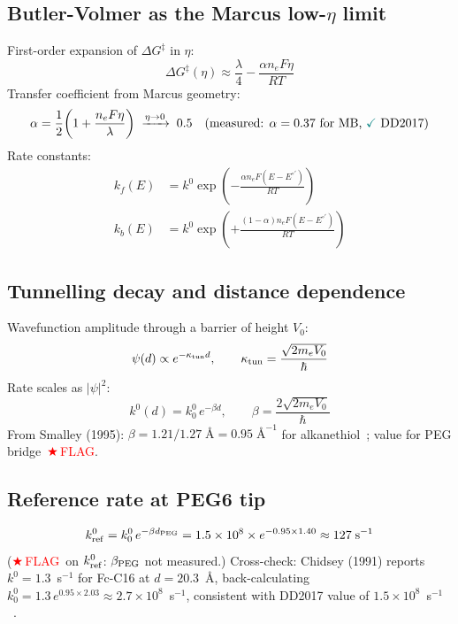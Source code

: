 \documentclass[10pt,a4paper]{article}
\numberwithin{equation}{section}
\newcommand{\FLAG}{\textcolor{red}{$\bigstar$\,FLAG}}
\newcommand{\CONF}{\textcolor{teal}{\checkmark}}
\newcommand{\kzero}{k^0}
\begin{document}
\subsection{Butler-Volmer as the Marcus low-$\eta$ limit}

First-order expansion of $\Delta G^\ddagger$ in $\eta$:
\begin{equation}
  \Delta G^\ddagger(\eta) \approx \frac{\lambda}{4} - \frac{\alpha n_e F\eta}{RT}
\end{equation}
Transfer coefficient from Marcus geometry:
\begin{equation}
  \alpha = \frac{1}{2}\!\left(1 + \frac{n_e F\eta}{\lambda}\right)
  \;\xrightarrow{\eta\to0}\; 0.5
  \quad\text{(measured: }\alpha = 0.37\text{ for MB, \CONF\ DD2017)}
\end{equation}
Rate constants:
\begin{align}
  k_f(E) &= \kzero\exp\!\left(-\frac{\alpha n_e F(E-E^{\circ\prime})}{RT}\right) \\
  k_b(E) &= \kzero\exp\!\left(+\frac{(1-\alpha)n_e F(E-E^{\circ\prime})}{RT}\right)
\end{align}

\subsection{Tunnelling decay and distance dependence}

Wavefunction amplitude through a barrier of height $V_0$:
\begin{equation}
  \psi(d)\propto e^{-\kappa_{\rm tun}d},\qquad
  \kappa_{\rm tun} = \frac{\sqrt{2m_e V_0}}{\hbar}
\end{equation}
Rate scales as $|\psi|^2$:
\begin{equation}
  \kzero(d) = \kzero_0\,e^{-\beta d},\qquad
  \beta = \frac{2\sqrt{2m_e V_0}}{\hbar}
\end{equation}
From Smalley (1995): $\beta = 1.21/1.27\;\text{\AA} = 0.95\;\text{\AA}^{-1}$
for alkanethiol~\CONF; value for PEG bridge~\FLAG.

\subsection{Reference rate at PEG6 tip}

\begin{equation}
  \kzero_{\rm ref} = \kzero_0\,e^{-\beta d_{\rm PEG}}
  = 1.5\times10^8 \times e^{-0.95\times1.40}
  \approx 127\;\text{s}^{-1}
\end{equation}
(\FLAG\ on $k^0_{\rm ref}$: $\beta_{\rm PEG}$ not measured.)
Cross-check: Chidsey (1991) reports $\kzero = 1.3$~s$^{-1}$ for Fc-C16 at
$d = 20.3$~\AA, back-calculating $\kzero_0 = 1.3\,e^{0.95\times2.03} \approx
2.7\times10^8$~s$^{-1}$, consistent with DD2017 value of $1.5\times10^8$~s$^{-1}$~\CONF.
\end{document}
